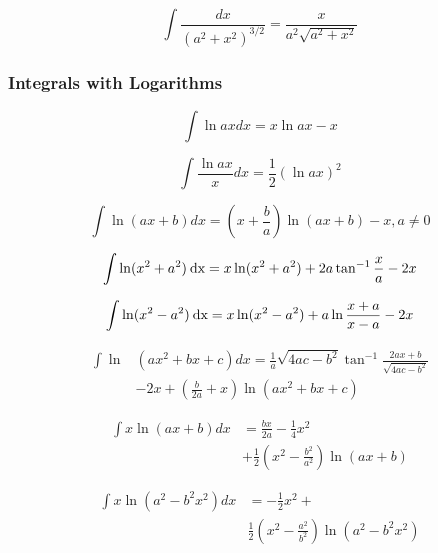 \documentclass[11pt, letterpaper, notitlepage]{article}
\begin{document}
\begin{multicols}{2}
\begin{footnotesize}
\begin{equation}
\int\frac{dx}{(a^2+x^2)^{3/2}}=\frac{x}{a^2\sqrt{a^2+x^2}}
\end{equation}

\subsubsection{Integrals with Logarithms}

\begin{equation}
\int \ln ax dx = x \ln ax - x 
\end{equation}

\begin{equation}
\int \frac{\ln ax}{x} dx = \frac{1}{2}\left ( \ln ax \right)^2 
\end{equation}

\begin{equation}
\int \ln (ax + b) dx = \left ( x + \frac{b}{a} \right) \ln (ax+b) - x , a\ne 0
\end{equation}

\begin{align}
\int \ln  ( x^2 + a^2 )\hspace{.5ex}\text{dx} = x \ln (x^2 + a^2  ) +2a\tan^{-1} \frac{x}{a} - 2x 
\end{align}

\begin{align}
\int \ln  ( x^2 - a^2 )\hspace{.5ex}\text{dx} = x \ln (x^2 - a^2  ) +a\ln \frac{x+a}{x-a} - 2x \end{align}

\begin{align}
\int \ln & \left ( ax^2 + bx + c\right) dx  = \frac{1}{a}\sqrt{4ac-b^2}\tan^{-1}\frac{2ax+b}{\sqrt{4ac-b^2}}
\nonumber \\ & -2x
 + \left( \frac{b}{2a}+x \right )\ln \left (ax^2+bx+c \right) 
\end{align}

\begin{align}
\int x \ln (ax + b) dx &= \frac{bx}{2a}-\frac{1}{4}x^2 \nonumber
\\&
+\frac{1}{2}\left(x^2-\frac{b^2}{a^2}\right)\ln (ax+b) 
\end{align}

\begin{align}
\int x \ln \left ( a^2 - b^2 x^2 \right ) dx &= -\frac{1}{2}x^2+ \nonumber
\\&
\frac{1}{2}\left( x^2 - \frac{a^2}{b^2} \right ) \ln \left (a^2 -b^2 x^2 \right) 
\end{align}


\end{footnotesize}
\end{multicols}
\end{document}
